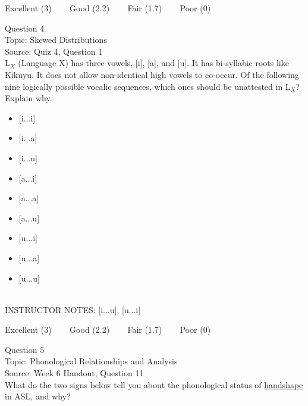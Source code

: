 \documentclass[12pt]{article}
\begin{document}
\vfill
Excellent (3) ~~~ Good (2.2) ~~~ Fair (1.7) ~~~ Poor (0)
\newpage

{\large Question 4}\\

Topic: Skewed Distributions\\
Source: Quiz 4, Question 1\\

L$_X$ (Language X) has three vowels, [i], [a], and [u]. It has bi-syllabic roots like Kikuyu. It does not allow non-identical high vowels to co-occur. Of the following nine logically possible vocalic sequences, which ones should be unattested in L$_X$? Explain why.\\

\begin{itemize} \item {[i...i]} \item {[i...a]} \item {[i...u]} \item {[a...i]} \item {[a...a]} \item {[a...u]} \item {[u...i]} \item {[u...a]} \item {[u...u]} \end{itemize}


~\\
INSTRUCTOR NOTES: [i...u], [u...i]


\vfill
Excellent (3) ~~~ Good (2.2) ~~~ Fair (1.7) ~~~ Poor (0)
\newpage

{\large Question 5}\\

Topic: Phonological Relationships and Analysis\\
Source: Week 6 Handout, Question 11\\

What do the two signs below tell you about the phonological status of \underline{handshape} in ASL, and why?\\
\end{document}

